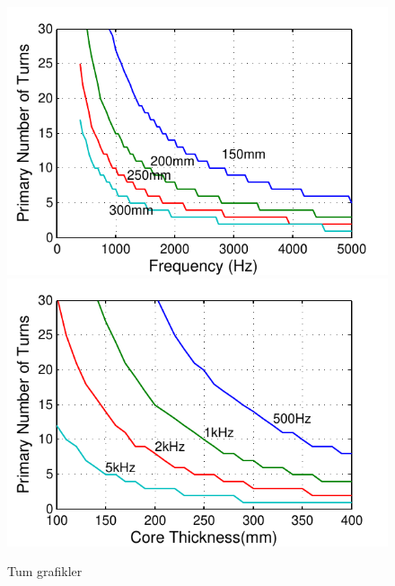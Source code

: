 \documentclass[a4paper, 11pt]{article} %
\begin{document}
\begin{figure}[]
  \centering
    \includegraphics[]{primary_Nturns_core}
    \includegraphics[]{primary_Nturns_freq}
  \caption{Tum grafikler}
  \label{primary_thickness}
\end{figure}
\end{document}
